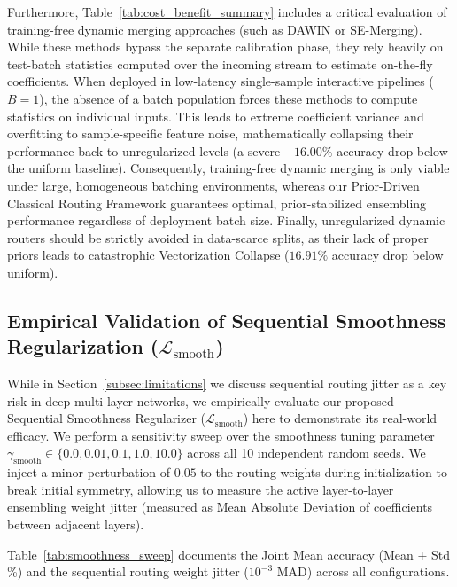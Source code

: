 Furthermore, Table~\ref{tab:cost_benefit_summary} includes a critical evaluation of training-free dynamic merging approaches (such as DAWIN or SE-Merging). While these methods bypass the separate calibration phase, they rely heavily on test-batch statistics computed over the incoming stream to estimate on-the-fly coefficients. When deployed in low-latency single-sample interactive pipelines ($B=1$), the absence of a batch population forces these methods to compute statistics on individual inputs. This leads to extreme coefficient variance and overfitting to sample-specific feature noise, mathematically collapsing their performance back to unregularized levels (a severe $-16.00\%$ accuracy drop below the uniform baseline). Consequently, training-free dynamic merging is only viable under large, homogeneous batching environments, whereas our Prior-Driven Classical Routing Framework guarantees optimal, prior-stabilized ensembling performance regardless of deployment batch size. Finally, unregularized dynamic routers should be strictly avoided in data-scarce splits, as their lack of proper priors leads to catastrophic Vectorization Collapse ($16.91\%$ accuracy drop below uniform).

\subsection{Empirical Validation of Sequential Smoothness Regularization ($\mathcal{L}_{\text{smooth}}$)}
\label{subsec:smoothness_experiments}
While in Section~\ref{subsec:limitations} we discuss sequential routing jitter as a key risk in deep multi-layer networks, we empirically evaluate our proposed Sequential Smoothness Regularizer ($\mathcal{L}_{\text{smooth}}$) here to demonstrate its real-world efficacy. We perform a sensitivity sweep over the smoothness tuning parameter $\gamma_{\text{smooth}} \in \{0.0, 0.01, 0.1, 1.0, 10.0\}$ across all 10 independent random seeds. We inject a minor perturbation of $0.05$ to the routing weights during initialization to break initial symmetry, allowing us to measure the active layer-to-layer ensembling weight jitter (measured as Mean Absolute Deviation of coefficients between adjacent layers).

Table~\ref{tab:smoothness_sweep} documents the Joint Mean accuracy (Mean $\pm$ Std \%) and the sequential routing weight jitter ($10^{-3}$ MAD) across all configurations.

